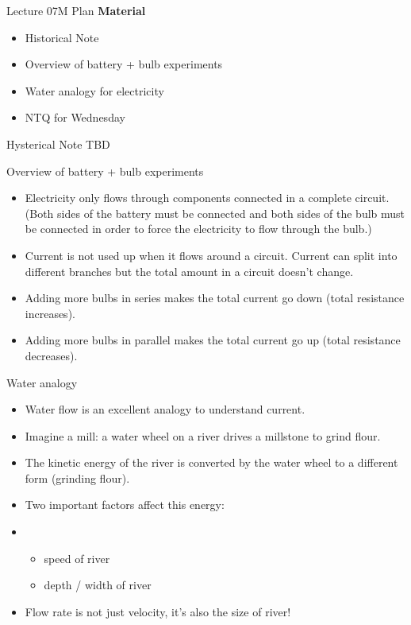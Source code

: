 \documentclass[english]{beamer}
\begin{document}
\begin{frame}{Lecture 07M Plan}
  \textbf{Material}
  \begin{itemize}
    \item Historical Note
    \item Overview of battery + bulb experiments
    \item Water analogy for electricity
    \item NTQ for Wednesday
  \end{itemize}
\end{frame}

\begin{frame}{Hysterical Note}
  TBD
\end{frame}

\begin{frame}{Overview of battery + bulb experiments}
  \begin{itemize}
    \item Electricity only flows through components connected in a complete circuit. (Both sides of the battery must be connected and both sides of the bulb must be connected in order to force the electricity to flow through the bulb.)
    \item Current is not used up when it flows around a circuit. Current can split into different branches but the total amount in a circuit doesn't change.
    \item Adding more bulbs in series makes the total current go down (total resistance increases).
    \item Adding more bulbs in parallel makes the total current go up (total resistance decreases).
  \end{itemize}
\end{frame}

\begin{frame}{Water analogy}
  \begin{itemize}
    \item Water flow is an excellent analogy to understand current.
    \item Imagine a mill: a water wheel on a river drives a millstone to grind flour.
    \item The kinetic energy of the river is converted by the water wheel to a different form (grinding flour).
    \item Two important factors affect this energy:
    \item \begin{itemize}
      \item speed of river
      \item depth / width of river
      \end{itemize}
    \item Flow rate is not just velocity, it's also the size of river!
  \end{itemize}
\end{frame}
\end{document}
